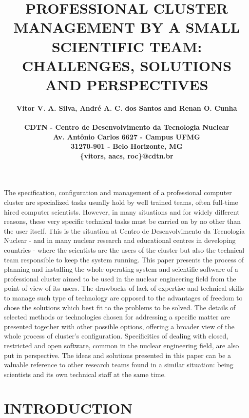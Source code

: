\documentclass[twoside,a4paper,12pt,english]{inac17}
\title{PROFESSIONAL CLUSTER MANAGEMENT BY A SMALL SCIENTIFIC TEAM: CHALLENGES, SOLUTIONS
AND PERSPECTIVES}
\author{
  \bf{Vitor V. A. Silva, Andr\'e A. C. dos Santos and Renan O. Cunha}\\ \\
  CDTN - Centro de Desenvolvimento da Tecnologia Nuclear\\
  Av. Ant\^onio Carlos 6627 - Campus UFMG\\
  31270-901 - Belo Horizonte, MG\\
  \{vitors, aacs, roc\}@cdtn.br}
\begin{document}
\maketitle

\pagestyle{myheadings}
\thispagestyle{empty}
\markboth{}{}


\thispagestyle{empty}

\begin{abstract_full_paper}
  The specification, configuration and management of a professional computer cluster are specialized
tasks usually hold by well trained teams, often full-time hired computer scientists. However, in
many situations and for widely different reasons, these very specific technical tasks must
be carried on by no other than the user itself. This is the situation at Centro de Desenvolvimento
da Tecnologia Nuclear - and in many nuclear research and educational centres in developing countries -
where the scientists are the users of the cluster but also the technical
team responsible to keep the system running. This paper presents the process of planning
and installing the whole operating system and scientific software of a professional cluster
aimed to be used in the nuclear engineering field from the point of view of its users.
The drawbacks of lack of expertise and technical skills to
manage such type of technology are opposed to the advantages of freedom to chose the solutions
which best fit to the problems to be solved. The details of selected methods or technologies
chosen for addressing a specific matter are presented together with other possible options, 
offering a broader view of the whole process of cluster's configuration. Specificities
of dealing with closed, restricted and open software, common in the nuclear engineering field,
are also put in perspective. The ideas and solutions presented in this paper can be a
valuable reference to other research teams found in a similar situation:
being scientists and its own technical staff at the same time.
\end{abstract_full_paper}

\section{INTRODUCTION}\label{int}
\end{document}
